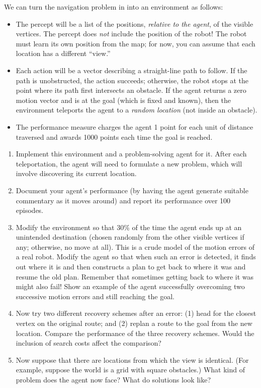 \begin{exercise}%
\prgex
We can turn the navigation problem in 
into an environment as follows:
\begin{itemize} 
\item The percept will be a list of
the positions, {\em relative to the agent}, of the visible vertices.
The percept does {\em not} include the position of the robot!
The robot must learn its own position from the map; for now, you
can assume that each location has a different ``view.''
\item Each action will be a vector describing
a straight-line path to follow. If the path is unobstructed,
the action succeeds; otherwise, the robot stops at the point
where its path first intersects an obstacle.
If the agent returns a zero motion vector and is at the goal (which is
fixed and known), then the
environment teleports the agent to a {\it random location}
(not inside an obstacle).
\item The performance measure charges the agent 1 point for each unit
of distance traversed and awards 1000 points each time the goal is reached. 
\end{itemize}
\begin{enumerate}
\item Implement this environment and a problem-solving agent for it.
After each
teleportation, the agent will need to formulate a new problem, which will involve discovering its current location.
\item Document your agent's performance (by having the agent generate
suitable commentary as it moves around) and 
report its performance over 100 episodes.
\item Modify the environment so that 30\% of the time the agent ends up
at an unintended destination
(chosen randomly from the other visible vertices if any; otherwise, no
move at all). This is a crude model of the motion errors of a real robot.
Modify the agent so that when such an error is detected, 
it finds out where it is and then constructs a plan to
get back to where it was and resume the old plan. Remember that
sometimes getting back to where it was might also fail! Show an example
of the agent successfully overcoming two successive motion errors and
still reaching the goal.
\item Now try two different recovery schemes after an error: (1) head for
the closest vertex on the original route; and (2) replan a route to the
goal from the new location. Compare the performance of the three
recovery schemes. Would the inclusion of search costs affect the
comparison?
\item Now suppose that there are locations from which the view is
identical. (For example, suppose the world is a grid with square
obstacles.) What kind of problem does the agent now face? What do
solutions look like?
\end{enumerate} 
\end{exercise} 


